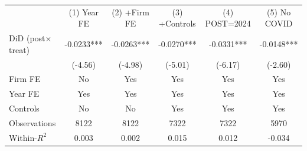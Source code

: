\begin{tabular}{lccccc}
\toprule
& \multicolumn{1}{c}{(1) Year FE} & \multicolumn{1}{c}{(2) +Firm FE} & \multicolumn{1}{c}{(3) +Controls} & \multicolumn{1}{c}{(4) POST=2024} & \multicolumn{1}{c}{(5) No COVID} \\
\cmidrule(lr){2-6}
DiD (post$\times$treat) & -0.0233*** & -0.0263*** & -0.0270*** & -0.0331*** & -0.0148*** \\
 & (-4.56) & (-4.98) & (-5.01) & (-6.17) & (-2.60) \\[2pt]
\midrule
Firm FE & No & Yes & Yes & Yes & Yes \\
Year FE & Yes & Yes & Yes & Yes & Yes \\
Controls & No & No & Yes & Yes & Yes \\
Observations & 8122 & 8122 & 7322 & 7322 & 5970 \\
Within-$R^2$ & 0.003 & 0.002 & 0.015 & 0.012 & -0.034 \\
\bottomrule
\end{tabular}